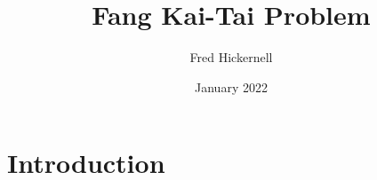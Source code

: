 \documentclass{article}
\title{Fang Kai-Tai Problem}
\author{Fred Hickernell}
\date{January 2022}
\begin{document}
\maketitle

\section{Introduction}
\end{document}
